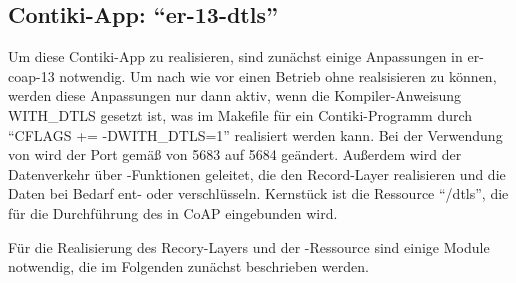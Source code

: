 \subsection{Contiki-App: "`er-13-dtls"'}

Um diese Contiki-App zu realisieren, sind zunächst einige Anpassungen in er-coap-13 notwendig. Um nach wie vor einen Betrieb ohne  realsisieren zu können,
werden diese Anpassungen nur dann aktiv, wenn die Kompiler-Anweisung WITH\_DTLS gesetzt ist, was im Makefile für ein Contiki-Programm durch "`CFLAGS += -DWITH\_DTLS=1"'
realisiert werden kann. Bei der Verwendung von  wird der Port gemäß \cite[Seite 93]{portnumbers} von 5683 auf 5684 geändert. Außerdem wird der Datenverkehr
über -Funktionen geleitet, die den Record-Layer realisieren und die Daten bei Bedarf ent- oder verschlüsseln. Kernstück ist die Ressource "`/dtls"', die für
die Durchführung des  in CoAP eingebunden wird.

Für die Realisierung des Recory-Layers und der -Ressource sind einige Module notwendig, die im Folgenden zunächst beschrieben werden.

